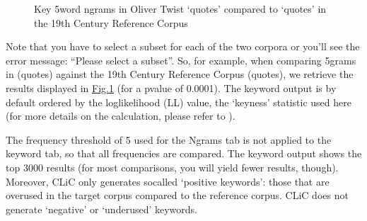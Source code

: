 \documentclass[letterpaper,10pt,english]{sphinxmanual}
\begin{document}
\begin{figure}[htbp]
\centering
\capstart

\noindent{}
\caption{Key 5\sphinxhyphen{}word n\sphinxhyphen{}grams in Oliver Twist ‘quotes’ compared to
‘quotes’ in the 19th Century Reference Corpus}\label{\detokenize{clicanalysis/keywords:id5}}\label{\detokenize{clicanalysis/keywords:figure-analysis-keywords-19thcentury}}\end{figure}

\sphinxAtStartPar
Note that you have to select a subset for each of the two corpora or
you’ll see the error message: “Please select a subset”. So, for example,
when comparing 5\sphinxhyphen{}grams in  (quotes) against the 19th
Century Reference Corpus (quotes), we retrieve the results displayed in
\hyperref[\detokenize{clicanalysis/keywords:figure-analysis-keywords-19thcentury}]{Fig.\@ \ref{\detokenize{clicanalysis/keywords:figure-analysis-keywords-19thcentury}}} (for a p\sphinxhyphen{}value of
0.0001). The keyword output is by default ordered by the log\sphinxhyphen{}likelihood
(LL) value, the ‘keyness’ statistic used here (for more details on the
calculation, please refer to ).

\sphinxAtStartPar
The frequency threshold of 5 used for the N\sphinxhyphen{}grams tab is not applied to
the keyword tab, so that all frequencies are compared. The keyword
output shows the top 3000 results (for most comparisons, you will yield
fewer results, though). Moreover, CLiC only generates so\sphinxhyphen{}called
‘positive keywords’: those that are overused in the target corpus
compared to the reference corpus. CLiC does not generate ‘negative’ or
‘underused’ keywords.

\sphinxstepscope
\end{document}

